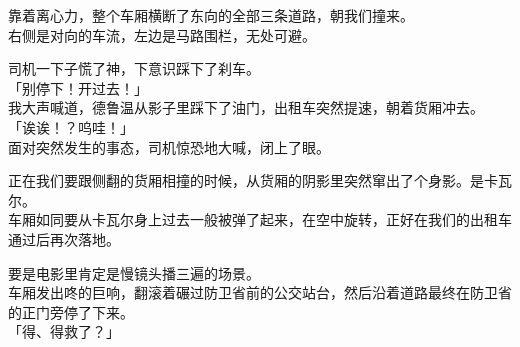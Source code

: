 靠着离心力，整个车厢横断了东向的全部三条道路，朝我们撞来。\\

右侧是对向的车流，左边是马路围栏，无处可避。

司机一下子慌了神，下意识踩下了刹车。\\

「别停下！开过去！」\\

我大声喊道，德鲁温从影子里踩下了油门，出租车突然提速，朝着货厢冲去。\\

「诶诶！？呜哇！」\\

面对突然发生的事态，司机惊恐地大喊，闭上了眼。

正在我们要跟侧翻的货厢相撞的时候，从货厢的阴影里突然窜出了个身影。是卡瓦尔。\\

车厢如同要从卡瓦尔身上过去一般被弹了起来，在空中旋转，正好在我们的出租车通过后再次落地。

要是电影里肯定是慢镜头播三遍的场景。\\

车厢发出咚的巨响，翻滚着碾过防卫省前的公交站台，然后沿着道路最终在防卫省的正门旁停了下来。\\

「得、得救了？」\\

